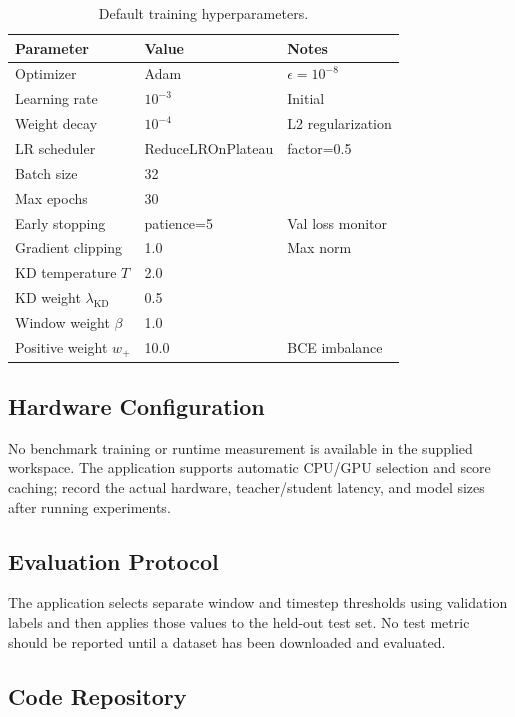 \documentclass[10pt,twocolumn]{article}
\begin{document}
\begin{table}[H]
\centering
\caption{Default training hyperparameters.}
\small
\begin{tabular}{lll}
\toprule
\textbf{Parameter} & \textbf{Value} & \textbf{Notes} \\
\midrule
Optimizer & Adam & $\epsilon = 10^{-8}$ \\
Learning rate & $10^{-3}$ & Initial \\
Weight decay & $10^{-4}$ & L2 regularization \\
LR scheduler & ReduceLROnPlateau & factor=0.5 \\
Batch size & 32 & \\
Max epochs & 30 & \\
Early stopping & patience=5 & Val loss monitor \\
Gradient clipping & 1.0 & Max norm \\
KD temperature $T$ & 2.0 & \\
KD weight $\lambda_{\text{KD}}$ & 0.5 & \\
Window weight $\beta$ & 1.0 & \\
Positive weight $w_+$ & 10.0 & BCE imbalance \\
\bottomrule
\end{tabular}
\label{tab:hparams}
\end{table}

\subsection{Hardware Configuration}

No benchmark training or runtime measurement is available in the supplied workspace. The application supports automatic CPU/GPU selection and score caching; record the actual hardware, teacher/student latency, and model sizes after running experiments.

\subsection{Evaluation Protocol}

The application selects separate window and timestep thresholds using validation labels and then applies those values to the held-out test set. No test metric should be reported until a dataset has been downloaded and evaluated.

\subsection{Code Repository}
\end{document}
